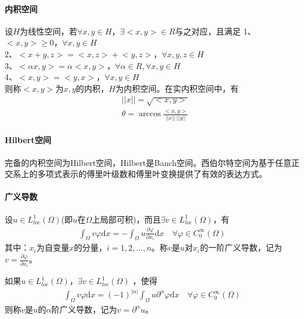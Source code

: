         \paragraph{内积空间}
        设$H$为线性空间，若$\forall x,y \in H$，$\exists \bigl<x,y\bigr>\in R$与之对应，且满足
        1、$\bigl<x,y\bigr> \geqslant 0$，$\forall x,y \in H$\\
        2、$\bigl<x+y,z\bigr> = \bigl<x,z\bigr> + \bigl<y,z\bigr>$，$\forall x,y,z \in H$\\
        3、$\bigl<\alpha x,y\bigr> = \alpha \bigl<x,y\bigr> $，$ \forall \alpha \in R,\forall x,y \in H$\\
        4、$\bigl<x,y\bigr> = \bigl<y,x\bigr> $，$\forall x,y \in H$\\
        则称$<x,y>$为$x,y$的内积，$H$为内积空间。在实内积空间中，有
        \begin{align*}
            &||x|| = \sqrt{\bigl<x,y\bigr>}\\
            &\theta = \arccos \frac{\bigl<x,y\bigr>}{||x||\ ||y||}
        \end{align*}
        \paragraph{Hilbert空间}
        完备的内积空间为Hilbert空间，Hilbert是Banch空间。西伯尔特空间为基于任意正交系上的多项式表示的傅里叶级数和傅里叶变换提供了有效的表达方式。
        \paragraph{广义导数}
        设$u \in L_{loc}^1 (\Omega)$(即$u$在$\Omega$上局部可积)，而且$\exists v\in L_{loc}^1 (\Omega)$，有
        \begin{align*}
            \int_{\Omega} v \varphi \mathrm{d}x = -\int_{\Omega}u \frac{\partial \varphi}{\partial x_i} \mathrm{d}x \quad \forall \varphi \in C_0^{\infty}(\Omega)
        \end{align*}
        其中：$x_i$为自变量$x$的分量，$i = 1,2,\dots,n$。称$v$是$u$对$x_i$的一阶广义导数，记为$v = \frac{\partial \varphi}{\partial x_i}$。
        \par
        如果$u \in L_{loc}^1 (\Omega)$，$\exists v\in L_{loc}^1 (\Omega)$ ，使得
        \begin{align*}
            \int_{\Omega} v \varphi \mathrm{d}x = (-1)^{|\alpha|}\int_{\Omega}u {\partial^{\alpha} \varphi}\mathrm{d}x \quad \forall \varphi \in C_0^{\infty}(\Omega)
        \end{align*}
        则称$v$是$u$的$\alpha$阶广义导数，记为$v= \partial^{\alpha} u$。

